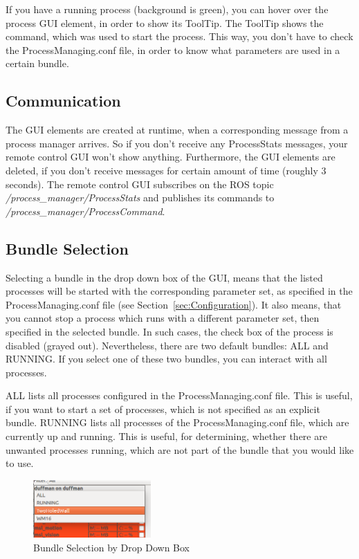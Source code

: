 If you have a running process (background is green), you can hover over the process GUI element, in order to show its ToolTip. The ToolTip shows the command, which was used to start the process. This way, you don't have to check the ProcessManaging.conf file, in order to know what parameters are used in a certain bundle.


\subsection*{Communication}

The GUI elements are created at runtime, when a corresponding message from a process manager arrives. So if you don't receive any ProcessStats messages, your remote control GUI won't show anything. Furthermore, the GUI elements are deleted, if you don't receive messages for certain amount of time (roughly 3 seconds). The remote control GUI subscribes on the ROS topic \emph{/process\_manager/ProcessStats} and publishes its commands to \emph{/process\_manager/ProcessCommand}.

\subsection*{Bundle Selection}
\label{ssec:BundleSelection}

Selecting a bundle in the drop down box of the GUI, means that the listed processes will be started with the corresponding parameter set, as specified in the ProcessManaging.conf file (see Section~\ref{sec:Configuration}). It also means, that you cannot stop a process which runs with a different parameter set, then specified in the selected bundle. In such cases, the check box of the process is disabled (grayed out). Nevertheless, there are two default bundles: ALL and RUNNING. If you select one of these two bundles, you can interact with all processes.

ALL lists all processes configured in the ProcessManaging.conf file. This is useful, if you want to start a set of processes, which is not specified as an explicit bundle. RUNNING lists all processes of the ProcessManaging.conf file, which are currently up and running. This is useful, for determining, whether there are unwanted processes running, which are not part of the bundle that you would like to use.

\begin{figure}[htbp]
 \centering
 \includegraphics[width=0.4\textwidth]{pic/ProcManBundleSelection.png}
 \caption{Bundle Selection by Drop Down Box}
 \label{fig:ProcManBundleSelection}
\end{figure}

